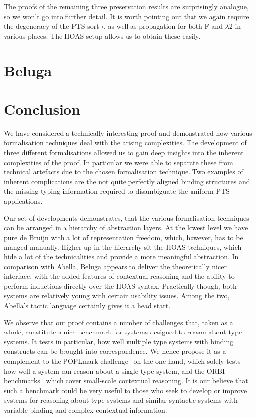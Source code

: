 \documentclass[a4paper,UKenglish]{lipics-v2016}
\newcommand{\SysL}{$\lambda$2\xspace}
\newcommand{\Typ}{\ensuremath{\square}}
\theoremstyle{plain}
\begin{document}
The proofs of the remaining three preservation results are surprisingly analogue, so we won't go into further detail.
It is worth pointing out that we again require the degeneracy of the PTS sort $\Typ$, as well as propagation for both F and \SysL in various places.
The HOAS setup allows us to obtain these easily.

\section{Beluga}
\label{sec:beluga}


\section{Conclusion}
\label{sec:conclusion}

We have considered a technically interesting proof and demonstrated how various formalisation techniques deal with the arising complexities.
The development of three different formalisations allowed us to gain deep insights into the inherent complexities of the proof.
In particular we were able to separate these from technical artefacts due to the chosen formalisation technique.
Two examples of inherent complications are the not quite perfectly aligned binding structures and the missing typing information required to disambiguate the uniform PTS applications.

Our set of developments demonstrates, that the various formalisation techniques can be arranged in a hierarchy of abstraction layers.
At the lowest level we have pure de Bruijn with a lot of representation freedom, which, however, has to be manged manually.
Higher up in the hierarchy sit the HOAS techniques, which hide a lot of the technicalities and provide a more meaningful abstraction.
In comparison with Abella, Beluga appears to deliver the theoretically nicer interface, with the added features of contextual reasoning and the ability to perform inductions directly over the HOAS syntax.
Practically though, both systems are relatively young with certain usability issues.
Among the two, Abella's tactic language certainly gives it a head start.

We observe that our proof contains a number of challenges that, taken as a whole, constitute a nice benchmark for systems designed to reason about type systems.
It tests in particular, how well multiple type systems with binding constructs can be brought into correspondence.
We hence propose it as a complement to the POPLmark challenge~\cite{poplmark} on the one hand, which solely tests how well a system can reason about a single type system, and the ORBI benchmarks~\cite{Felty:ITP10,Felty:orbi-survey} which cover small-scale contextual reasoning.
It is our believe that such a benchmark could be very useful to those who seek to develop or improve systems for reasoning about type systems and similar syntactic systems with variable binding and complex contextual information.
\end{document}
